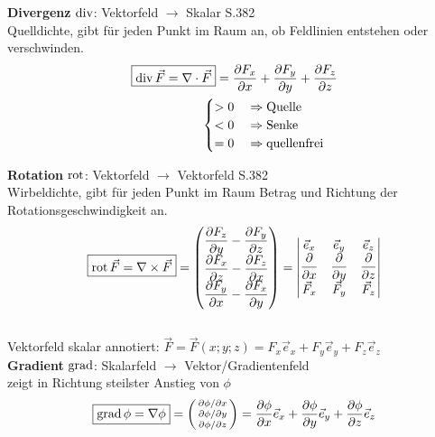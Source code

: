 	\textbf{Divergenz} $\operatorname{div}$: Vektorfeld $\rightarrow$ Skalar \qquad S.382\\
	\small{Quelldichte, gibt für jeden Punkt im Raum an, ob Feldlinien entstehen oder verschwinden.}
	\begin{align*}
		\boxed{\operatorname{div} \vec{F} = \nabla \cdot \vec{F}}   =  \dfrac{\partial F_x}{\partial x}
		+ \dfrac{\partial F_y}{\partial y} + \dfrac{\partial F_z}{\partial z} \\
		\begin{cases}
			> 0 \quad\Rightarrow \textnormal{Quelle} \\
			< 0 \quad\Rightarrow \textnormal{Senke}  \\
			= 0 \quad\Rightarrow \textnormal{quellenfrei}
		\end{cases}
	\end{align*}

	\textbf{Rotation} $\operatorname{rot}$: Vektorfeld $\rightarrow$ Vektorfeld \qquad S.382\\
	\small{Wirbeldichte, gibt für jeden Punkt im Raum Betrag und Richtung der Rotationsgeschwindigkeit an.}
	\begin{align*}
		\boxed{\operatorname{rot} \vec{F} = \nabla \times \vec{F} } =
		\begin{pmatrix}
			\dfrac{\partial F_z}{\partial y} - \dfrac{\partial F_y}{\partial z} \\
			\dfrac{\partial F_x}{\partial z} - \dfrac{\partial F_z}{\partial x} \\
			\dfrac{\partial F_y}{\partial x} - \dfrac{\partial F_x}{\partial y}
		\end{pmatrix} =
		\begin{vmatrix}
			\vec{e}_x                    & \vec{e}_y                     & \vec{e}_z                     \\
			\dfrac{\partial}{\partial x} & \dfrac{\partial }{\partial y} & \dfrac{\partial }{\partial z} \\
			\vec{F}_x                    & \vec{F}_y                     & \vec{F}_z
		\end{vmatrix}
	\end{align*}\\
	Vektorfeld skalar annotiert: $\vec{F} = \vec{F}(x;y;z) = F_x\vec{e}_x+F_y\vec{e}_y+F_z\vec{e}_z$\\

	\textbf{Gradient} $\operatorname{grad}$: Skalarfeld $\rightarrow$ Vektor/Gradientenfeld\\
	\small{zeigt in Richtung steilster Anstieg von $\phi$}
	\begin{align*}
		\boxed{\operatorname{grad} \phi = \nabla \phi }=
		\begin{psmallmatrix}
			\partial \phi / \partial x \\
			\partial \phi / \partial y \\
			\partial \phi / \partial z
		\end{psmallmatrix}
		= \dfrac{\partial \phi}{\partial x} \vec{e}_x + \dfrac{\partial \phi}{\partial y} \vec{e}_y +
		\dfrac{\partial \phi}{\partial z} \vec{e}_z
	\end{align*}

